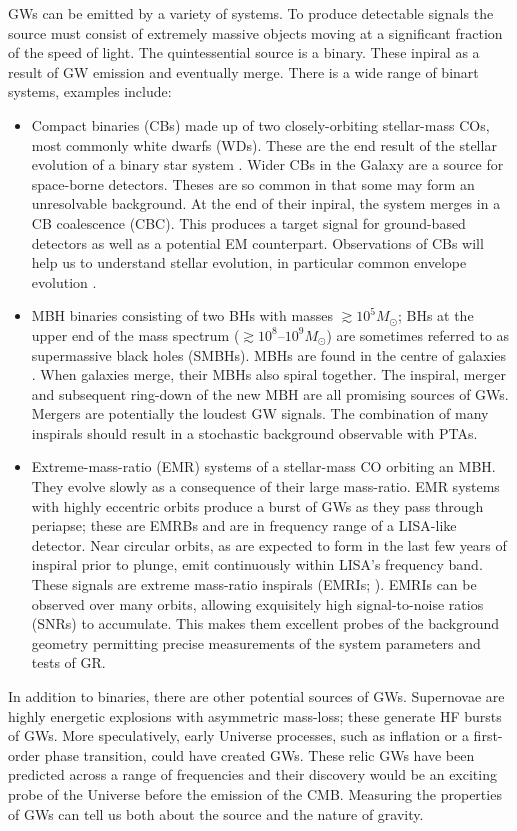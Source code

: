 GWs can be emitted by a variety of systems. To produce detectable signals the source must consist of extremely massive objects moving at a significant fraction of the speed of light. The quintessential source is a binary. These inpiral as a result of GW emission and eventually merge. There is a wide range of binart systems, examples include:
\begin{itemize}
\item Compact binaries (CBs) made up of two closely-orbiting stellar-mass COs, most commonly white dwarfs (WDs). These are the end result of the stellar evolution of a binary star system \citep{Postnov2006}. Wider CBs in the Galaxy are a source for space-borne detectors. Theses are so common in that some may form an unresolvable background. At the end of their inpiral, the system merges in a CB coalescence (CBC). This produces a target signal for ground-based detectors \citep{Abadie2010a} as well as a potential EM counterpart. Observations of CBs will help us to understand stellar evolution, in particular common envelope evolution \citep{Ivanova2013}.

\item MBH binaries consisting of two BHs with masses $\gtrsim 10^5 M_\odot$; BHs at the upper end of the mass spectrum ($\gtrsim10^8$--$10^9 M_\odot$) are sometimes referred to as supermassive black holes (SMBHs). MBHs are found in the centre of galaxies \citep{Lynden-Bell1969,Ferrarese2005}. When galaxies merge, their MBHs also spiral together. The inspiral, merger and subsequent ring-down of the new MBH are all promising sources of GWs. Mergers are potentially the loudest GW signals. The combination of many inspirals should result in a stochastic background observable with PTAs.

\item Extreme-mass-ratio (EMR) systems of a stellar-mass CO orbiting an MBH. They evolve slowly as a consequence of their large mass-ratio. EMR systems with highly eccentric orbits produce a burst of GWs as they pass through periapse; these are EMRBs and are in frequency range of a LISA-like detector. Near circular orbits, as are expected to form in the last few years of inspiral prior to plunge, emit continuously within LISA's frequency band. These signals are extreme mass-ratio inspirals (EMRIs; \citealt{Amaro-Seoane2007}). EMRIs can be observed over many orbits, allowing exquisitely high signal-to-noise ratios (SNRs) to accumulate. This makes them excellent probes of the background geometry permitting precise measurements of the system parameters and tests of GR.
\end{itemize}
In addition to binaries, there are other potential sources of GWs. Supernovae are highly energetic explosions with asymmetric mass-loss; these generate HF bursts of GWs. More speculatively, early Universe processes, such as inflation or a first-order phase transition, could have created GWs. These relic GWs have been predicted across a range of frequencies and their discovery would be an exciting probe of the Universe before the emission of the CMB. Measuring the properties of GWs can tell us both about the source and the nature of gravity.

